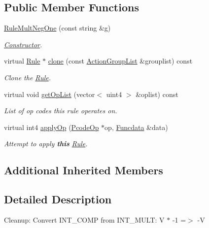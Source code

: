 \subsection*{Public Member Functions}
\begin{DoxyCompactItemize}
\item 
\mbox{\hyperlink{class_rule_mult_neg_one_a433ee18fe0cbf544db9c6d53424eba0e}{Rule\+Mult\+Neg\+One}} (const string \&g)
\begin{DoxyCompactList}\small\item\em \mbox{\hyperlink{class_constructor}{Constructor}}. \end{DoxyCompactList}\item 
virtual \mbox{\hyperlink{class_rule}{Rule}} $\ast$ \mbox{\hyperlink{class_rule_mult_neg_one_a0d2b0402af95e0c0c3966213a5248581}{clone}} (const \mbox{\hyperlink{class_action_group_list}{Action\+Group\+List}} \&grouplist) const
\begin{DoxyCompactList}\small\item\em Clone the \mbox{\hyperlink{class_rule}{Rule}}. \end{DoxyCompactList}\item 
virtual void \mbox{\hyperlink{class_rule_mult_neg_one_af6cff79cf3a0353b28ffede568a34ad5}{get\+Op\+List}} (vector$<$ uint4 $>$ \&oplist) const
\begin{DoxyCompactList}\small\item\em List of op codes this rule operates on. \end{DoxyCompactList}\item 
virtual int4 \mbox{\hyperlink{class_rule_mult_neg_one_a3a1d3552604a9d5464f23ef332376918}{apply\+Op}} (\mbox{\hyperlink{class_pcode_op}{Pcode\+Op}} $\ast$op, \mbox{\hyperlink{class_funcdata}{Funcdata}} \&data)
\begin{DoxyCompactList}\small\item\em Attempt to apply {\bfseries{this}} \mbox{\hyperlink{class_rule}{Rule}}. \end{DoxyCompactList}\end{DoxyCompactItemize}
\subsection*{Additional Inherited Members}


\subsection{Detailed Description}
Cleanup\+: Convert I\+N\+T\+\_\+C\+O\+MP from I\+N\+T\+\_\+\+M\+U\+LT\+: {\ttfamily V $\ast$ -\/1 =$>$ -\/V} 

